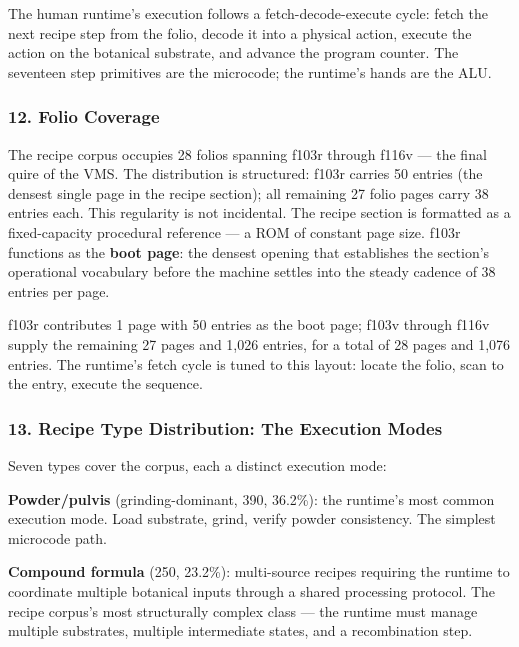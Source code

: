The human runtime's execution follows a fetch-decode-execute cycle:
fetch the next recipe step from the folio, decode it into a physical
action, execute the action on the botanical substrate, and advance the
program counter. The seventeen step primitives are the microcode; the
runtime's hands are the ALU.

\hypertarget{folio-coverage}{%
\subsubsection{12. Folio Coverage}\label{folio-coverage}}

The recipe corpus occupies 28 folios spanning f103r through f116v ---
the final quire of the VMS. The distribution is structured: f103r
carries 50 entries (the densest single page in the recipe section); all
remaining 27 folio pages carry 38 entries each. This regularity is not
incidental. The recipe section is formatted as a fixed-capacity
procedural reference --- a ROM of constant page size. f103r functions as
the \textbf{boot page}: the densest opening that establishes the
section's operational vocabulary before the machine settles into the
steady cadence of 38 entries per page.

f103r contributes 1 page with 50 entries as the boot page; f103v through
f116v supply the remaining 27 pages and 1,026 entries, for a total of 28
pages and 1,076 entries. The runtime's fetch cycle is tuned to this
layout: locate the folio, scan to the entry, execute the sequence.

\hypertarget{recipe-type-distribution-the-execution-modes}{%
\subsubsection{13. Recipe Type Distribution: The Execution
Modes}\label{recipe-type-distribution-the-execution-modes}}

Seven types cover the corpus, each a distinct execution mode:

\textbf{Powder/pulvis} (grinding-dominant, 390, 36.2\%): the runtime's
most common execution mode. Load substrate, grind, verify powder
consistency. The simplest microcode path.

\textbf{Compound formula} (250, 23.2\%): multi-source recipes requiring
the runtime to coordinate multiple botanical inputs through a shared
processing protocol. The recipe corpus's most structurally complex class
--- the runtime must manage multiple substrates, multiple intermediate
states, and a recombination step.

